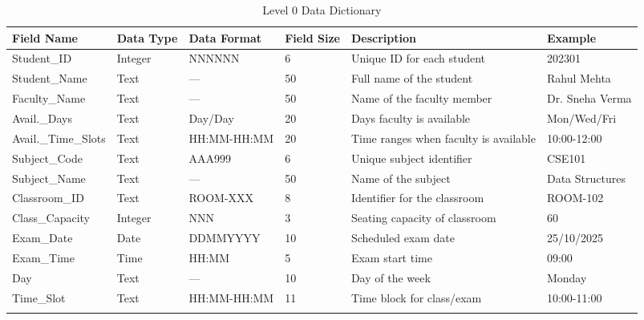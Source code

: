 \documentclass[a4paper,12pt]{article}
\begin{document}
\begin{longtable}{|p{2.7cm}|p{1.2cm}|p{2.5cm}|p{0.7cm}|p{3.0cm}|p{2.5cm}|}
\hline
\textbf{Field Name} & \textbf{Data Type} & \textbf{Data Format} & \textbf{Field Size} & \textbf{Description} & \textbf{Example} \\
\hline
\endfirsthead
\endhead



\endlastfoot
Student\_ID & Integer & NNNNNN & 6 & Unique ID for each student & 202301 \\
\hline
Student\_Name & Text & — & 50 & Full name of the student & Rahul Mehta \\
\hline
Faculty\_Name & Text & — & 50 & Name of the faculty member & Dr. Sneha Verma \\
\hline
Avail.\_Days & Text & Day/Day & 20 & Days faculty is available & Mon/Wed/Fri \\
\hline
Avail.\_Time\_Slots & Text & HH:MM-HH:MM & 20 & Time ranges when faculty is available & 10:00-12:00 \\
\hline
Subject\_Code & Text & AAA999 & 6 & Unique subject identifier & CSE101 \\
\hline
Subject\_Name & Text & — & 50 & Name of the subject & Data Structures \\
\hline
Classroom\_ID & Text & ROOM-XXX & 8 & Identifier for the classroom & ROOM-102 \\
\hline
Class\_Capacity & Integer & NNN & 3 & Seating capacity of classroom & 60 \\
\hline
Exam\_Date & Date & DDMMYYYY & 10 & Scheduled exam date & 25/10/2025 \\
\hline
Exam\_Time & Time & HH:MM & 5 & Exam start time & 09:00 \\
\hline
Day & Text & — & 10 & Day of the week & Monday \\
\hline
Time\_Slot & Text & HH:MM-HH:MM & 11 & Time block for class/exam & 10:00-11:00 \\
\hline
\caption{Level 0 Data Dictionary}
\label{tag:placeholder}
\end{longtable}
\end{document}

